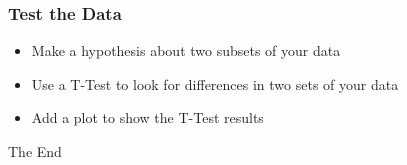 \documentclass[14pt]{beamer}
\begin{document}
\begin{frame}
\frametitle{Test the Data}
\begin{itemize}
	\item<+-> Make a hypothesis about two subsets of your data
	\item<+-> Use a T-Test to look for differences in two sets of your data
	\item<+-> Add a plot to show the T-Test results
\end{itemize}
\end{frame}

\begin{frame}
\Huge{\centerline{The End}}
\end{frame}

\end{document}
